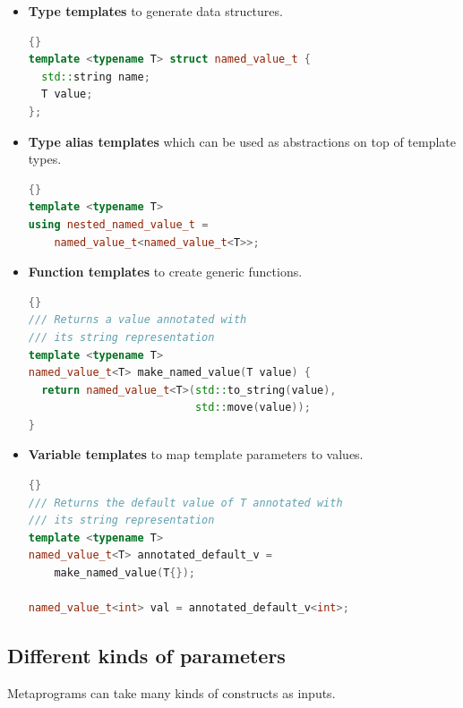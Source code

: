 \documentclass[../main]{subfiles}
\begin{document}
\begin{itemize}

  \item

\textbf{Type templates} to generate data structures.

\begin{lstlisting}[language=c++]{}
template <typename T> struct named_value_t {
  std::string name;
  T value;
};
\end{lstlisting}

  \item

\textbf{Type alias templates} which can be used as abstractions on top of
template types.

\begin{lstlisting}[language=c++]{}
template <typename T>
using nested_named_value_t =
    named_value_t<named_value_t<T>>;
\end{lstlisting}

  \item

\textbf{Function templates} to create generic functions.

\begin{lstlisting}[language=c++]{}
/// Returns a value annotated with
/// its string representation
template <typename T>
named_value_t<T> make_named_value(T value) {
  return named_value_t<T>(std::to_string(value),
                          std::move(value));
}
\end{lstlisting}

  \item

\textbf{Variable templates} to map template parameters to values.

\begin{lstlisting}[language=c++]{}
/// Returns the default value of T annotated with
/// its string representation
template <typename T>
named_value_t<T> annotated_default_v =
    make_named_value(T{});

named_value_t<int> val = annotated_default_v<int>;
\end{lstlisting}

\end{itemize}

\subsection{
  Different kinds of parameters
}

Metaprograms can take many kinds of \cpp constructs as inputs.
\end{document}
